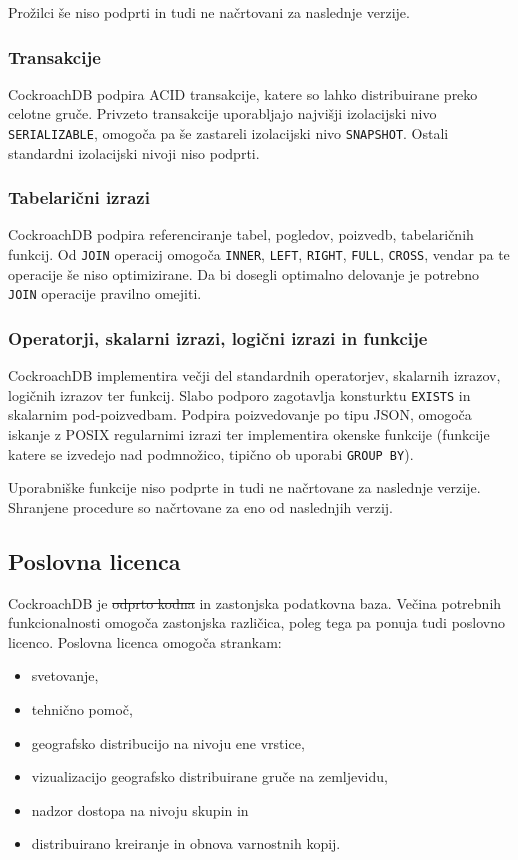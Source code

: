 \documentclass[a4paper, 12pt]{book}
\providecommand{\DIFaddtex}[1]{{\protect\color{blue}\uwave{#1}}} %
\providecommand{\DIFdeltex}[1]{{\protect\color{red}\sout{#1}}}                      %
\providecommand{\DIFaddbegin}{} %
\providecommand{\DIFaddend}{} %
\providecommand{\DIFdelbegin}{} %
\providecommand{\DIFdelend}{} %
\providecommand{\DIFadd}[1]{\texorpdfstring{\DIFaddtex{#1}}{#1}} %
\providecommand{\DIFdel}[1]{\texorpdfstring{\DIFdeltex{#1}}{}} %
\newcommand{\DIFscaledelfig}{0.5}
\newlength{\DIFdelgraphicswidth} %
\newlength{\DIFdelgraphicsheight} %
\newcommand{\DIFaddincludegraphics}[2][]{{\color{blue}\fbox{\DIFOincludegraphics[#1]{#2}}}} %
\newcommand{\DIFdelincludegraphics}[2][]{%
\sbox{\DIFdelgraphicsbox}{\DIFOincludegraphics[#1]{#2}}%
\settoboxwidth{\DIFdelgraphicswidth}{\DIFdelgraphicsbox} %
\settoboxtotalheight{\DIFdelgraphicsheight}{\DIFdelgraphicsbox} %
\scalebox{\DIFscaledelfig}{%
\parbox[b]{\DIFdelgraphicswidth}{\usebox{\DIFdelgraphicsbox}\\[-\baselineskip] \rule{\DIFdelgraphicswidth}{0em}}\llap{\resizebox{\DIFdelgraphicswidth}{\DIFdelgraphicsheight}{%
\setlength{\unitlength}{\DIFdelgraphicswidth}%
\begin{picture}(1,1)%
\thicklines\linethickness{2pt} %
{\color[rgb]{1,0,0}\put(0,0){\framebox(1,1){}}}%
{\color[rgb]{1,0,0}\put(0,0){\line( 1,1){1}}}%
{\color[rgb]{1,0,0}\put(0,1){\line(1,-1){1}}}%
\end{picture}%
}\hspace*{3pt}}} %
} %
\DeclareRobustCommand{\DIFaddbegin}{\DIFOaddbegin \let\includegraphics\DIFaddincludegraphics} %
\DeclareRobustCommand{\DIFaddend}{\DIFOaddend \let\includegraphics\DIFOincludegraphics} %
\DeclareRobustCommand{\DIFdelbegin}{\DIFOdelbegin \let\includegraphics\DIFdelincludegraphics} %
\DeclareRobustCommand{\DIFdelend}{\DIFOaddend \let\includegraphics\DIFOincludegraphics} %
\begin{document}
Prožilci še niso podprti in tudi ne načrtovani za naslednje verzije.

\subsubsection{Transakcije}
CockroachDB podpira ACID transakcije, katere so lahko distribuirane preko celotne gruče. Privzeto transakcije uporabljajo najvišji izolacijski nivo \texttt{SE\-RI\-AL\-IZ\-ABLE}, omogoča pa še zastareli izolacijski nivo \texttt{SNAP\-SHOT}. Ostali standardni izolacijski nivoji niso podprti.

\subsubsection{Tabelarični izrazi}
CockroachDB podpira referenciranje tabel, pogledov, poizvedb, tabelaričnih funkcij. Od \texttt{JOIN} operacij omogoča \texttt{INNER}, \texttt{LEFT}, \texttt{RIGHT}, \texttt{FULL}, \texttt{CROSS}, vendar pa te operacije še niso optimizirane. Da bi dosegli optimalno delovanje je potrebno \texttt{JOIN} operacije pravilno omejiti.

\subsubsection{Operatorji, skalarni izrazi, logični izrazi in funkcije}
CockroachDB implementira večji del standardnih operatorjev, skalarnih izrazov, logičnih izrazov ter funkcij. Slabo podporo zagotavlja konsturktu \texttt{EXISTS} in skalarnim pod-poizvedbam. Podpira poizvedovanje po tipu JSON, omogoča iskanje z POSIX regularnimi izrazi ter implementira okenske funkcije (funkcije katere se izvedejo nad podmnožico, tipično ob uporabi \texttt{GROUP BY}).

Uporabniške funkcije niso podprte in tudi ne načrtovane za naslednje verzije. Shranjene procedure so načrtovane za eno od naslednjih verzij.

\subsection{Poslovna licenca}

CockroachDB je \DIFdelbegin \DIFdel{odprto kodna }\DIFdelend \DIFaddbegin \DIFadd{odprtokodna }\DIFaddend in zastonjska podatkovna baza. Večina potrebnih funkcionalnosti omogoča zastonjska različica, poleg tega pa ponuja tudi poslovno licenco. Poslovna licenca omogoča strankam:

\begin{itemize}
    \item svetovanje,
    \item tehnično pomoč,
    \item geografsko distribucijo na nivoju ene vrstice,
    \item vizualizacijo geografsko distribuirane gruče na zemljevidu,
    \item nadzor dostopa na nivoju skupin in
    \item distribuirano kreiranje in obnova varnostnih kopij.
\end{itemize}
\end{document}
